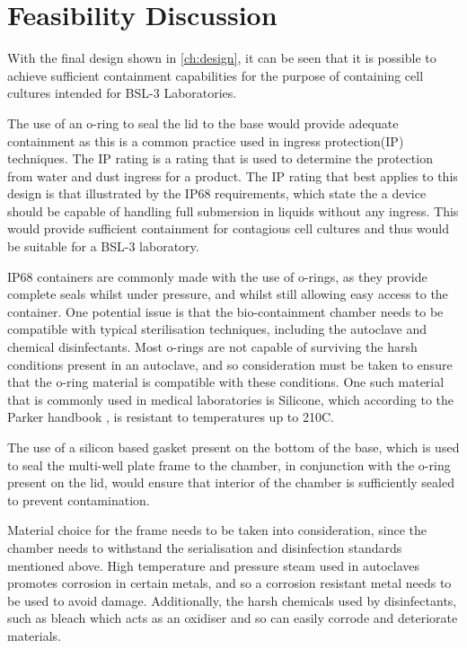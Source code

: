 \documentclass[class=report,11pt,crop=false]{standalone}
\begin{document}
\chapter{Feasibility Discussion} \label{ch:results}
\vspace{-1cm}
With the final design shown in \autoref{ch:design}, it can be seen that it is possible to achieve sufficient containment capabilities for the purpose of containing cell cultures intended for BSL-3 Laboratories.

The use of an o-ring to seal the lid to the base would provide adequate containment as this is a common practice used in ingress protection(IP) techniques. The IP rating \cite{IngressProtectionIP} is a rating that is used to determine the protection from water and dust ingress for a product. The IP rating that best applies to this design is that illustrated by the IP68 requirements, which state the a device should be capable of handling full submersion in liquids without any ingress. This would provide sufficient containment for contagious cell cultures and thus would be suitable for a BSL-3 laboratory. 

IP68 containers are commonly made with the use of o-rings, as they provide complete seals whilst under pressure, and whilst still allowing easy access to the container. One potential issue is that the bio-containment chamber needs to be compatible with typical sterilisation techniques, including the autoclave and chemical disinfectants. Most o-rings are not capable of surviving the harsh conditions present in an autoclave, and so consideration must be taken to ensure that the  o-ring material is compatible with these conditions. One such material that is commonly used in medical laboratories is Silicone, which according to the Parker handbook \cite[73]{ORingHandbook}, is resistant to temperatures up to 210\degree C.

The use of a silicon based gasket present on the bottom of the base, which is used to seal the multi-well plate frame to the chamber, in conjunction with the o-ring present on the lid, would ensure that interior of the chamber is sufficiently sealed to prevent contamination. 

Material choice for the frame needs to be taken into consideration, since the chamber needs to withstand the serialisation and disinfection standards mentioned above. High temperature and pressure steam used in autoclaves promotes corrosion in certain metals, and so a corrosion resistant metal needs to be used to avoid damage. Additionally, the harsh chemicals used by disinfectants, such as bleach which acts as an oxidiser and so can easily corrode and deteriorate materials.
\end{document}
